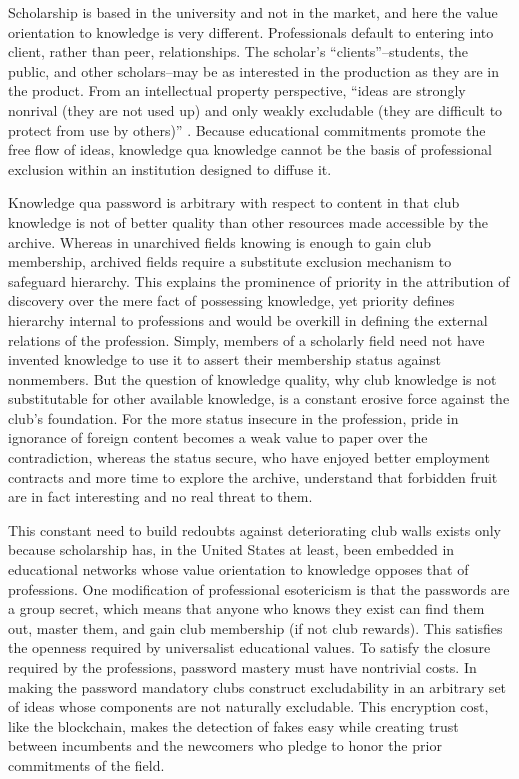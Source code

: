 \documentclass[]{book}
\theoremstyle{definition}
\theoremstyle{definition}
\theoremstyle{definition}
\theoremstyle{remark}
\begin{document}
Scholarship is based in the university and not in the market, and here
the value orientation to knowledge is very different. Professionals
default to entering into client, rather than peer, relationships. The
scholar's ``clients''--students, the public, and other scholars--may be
as interested in the production as they are in the product. From an
intellectual property perspective, ``ideas are strongly nonrival (they
are not used up) and only weakly excludable (they are difficult to
protect from use by others)'' \citep[278]{Thompson1995Conceptions}.
Because educational commitments promote the free flow of ideas,
knowledge qua knowledge cannot be the basis of professional exclusion
within an institution designed to diffuse it.

Knowledge qua password is arbitrary with respect to content in that club
knowledge is not of better quality than other resources made accessible
by the archive. Whereas in unarchived fields knowing is enough to gain
club membership, archived fields require a substitute exclusion
mechanism to safeguard hierarchy. This explains the prominence of
priority in the attribution of discovery over the mere fact of
possessing knowledge, yet priority defines hierarchy internal to
professions and would be overkill in defining the external relations of
the profession. Simply, members of a scholarly field need not have
invented knowledge to use it to assert their membership status against
nonmembers. But the question of knowledge quality, why club knowledge is
not substitutable for other available knowledge, is a constant erosive
force against the club's foundation. For the more status insecure in the
profession, pride in ignorance of foreign content becomes a weak value
to paper over the contradiction, whereas the status secure, who have
enjoyed better employment contracts and more time to explore the
archive, understand that forbidden fruit are in fact interesting and no
real threat to them.

This constant need to build redoubts against deteriorating club walls
exists only because scholarship has, in the United States at least, been
embedded in educational networks whose value orientation to knowledge
opposes that of professions. One modification of professional
esotericism is that the passwords are a group secret, which means that
anyone who knows they exist can find them out, master them, and gain
club membership (if not club rewards). This satisfies the openness
required by universalist educational values. To satisfy the closure
required by the professions, password mastery must have nontrivial
costs. In making the password mandatory clubs construct excludability in
an arbitrary set of ideas whose components are not naturally excludable.
This encryption cost, like the blockchain, makes the detection of fakes
easy while creating trust between incumbents and the newcomers who
pledge to honor the prior commitments of the field.
\end{document}
